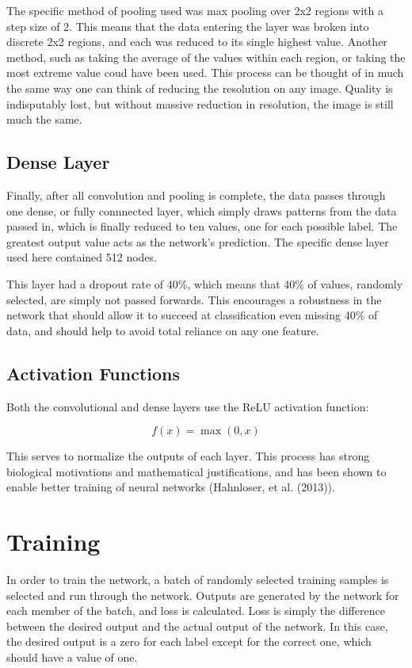 \documentclass{article}
\begin{document}
The specific method of pooling used was max pooling over 2x2 regions with a step size of 2. This means that the data entering the layer was broken into discrete 2x2 regions, and each was reduced to its single highest value. Another method, such as taking the average of the values within each region, or taking the most extreme value coud have been used. This process can be thought of in much the same way one can think of reducing the resolution on any image. Quality is indisputably lost, but without massive reduction in resolution, the image is still much the same.

\subsection{Dense Layer}

Finally, after all convolution and pooling is complete, the data passes through one dense, or fully connnected layer, which simply draws patterns from the data passed in, which is finally reduced to ten values, one for each possible label. The greatest output value acts as the network's prediction. The specific dense layer used here contained 512 nodes.

This layer had a dropout rate of 40\%, which means that 40\% of values, randomly selected, are simply not passed forwards. This encourages a robustness in the network that should allow it to succeed at classification even missing 40\% of data, and should help to avoid total reliance on any one feature.

\subsection{Activation Functions}

Both the convolutional and dense layers use the ReLU activation function:

\begin{equation*}
	f(x) = \max(0, x)
\end{equation*}

This serves to normalize the outputs of each layer. This process has strong biological motivations and mathematical justifications, and has been shown to enable better training of neural networks (Hahnloser, et al. (2013)).

\section{Training}

In order to train the network, a batch of randomly selected training samples is selected and run through the network. Outputs are generated by the network for each member of the batch, and loss is calculated. Loss is simply the difference between the desired output and the actual output of the network. In this case, the desired output is a zero for each label except for the correct one, which should have a value of one.
\end{document}
